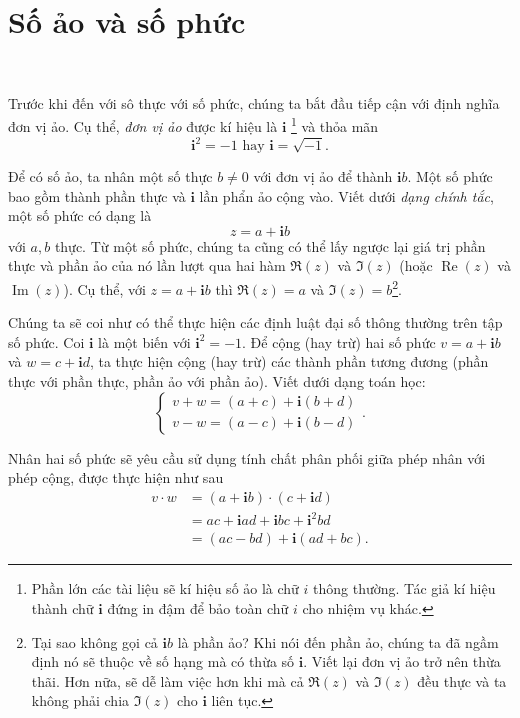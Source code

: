 \documentclass[a4paper, titlepage, openany]{book}
\begin{document}
\section{Số ảo và số phức}

\ %

Trước khi đến với sô thực với số phức, chúng ta bắt đầu tiếp cận với định nghĩa đơn vị ảo. Cụ thể, \emph{đơn vị ảo} được kí hiệu là $\mathbf{i}$ \footnote{Phần lớn các tài liệu sẽ kí hiệu số ảo là chữ $i$ thông thường. Tác giả kí hiệu thành chữ $\mathbf{i}$ đứng in đậm để bảo toàn chữ $i$ cho nhiệm vụ khác.} và thỏa mãn $$\mathbf{i}^2 = -1 \text{ hay } \mathbf{i} = \sqrt{-1}.$$

Để có số ảo, ta nhân một số thực $b \neq 0$ với đơn vị ảo để thành $\mathbf{i}b$. Một số phức bao gồm thành phần thực và $\mathbf{i}$ lần phẩn ảo cộng vào. Viết dưới \emph{dạng chính tắc}, một số phức có dạng là $$z=a+\mathbf{i}b$$ với $a, b$ thực. Từ một số phức, chúng ta cũng có thể lấy ngược lại giá trị phần thực và phần ảo của nó lần lượt qua hai hàm $\Re{(z)}$ và $\Im{(z)}$ (hoặc $\operatorname*{Re}{(z)}$ và $\operatorname*{Im}{(z)}$). Cụ thể, với $z=a+\mathbf{i}b$ thì $\Re{(z)} = a$ và $\Im{(z)}=b$\footnote{Tại sao không gọi cả $\mathbf{i}b$ là phần ảo? Khi nói đến phần ảo, chúng ta đã ngầm định nó sẽ thuộc về số hạng mà có thừa số $\mathbf{i}$. Viết lại đơn vị ảo trở nên thừa thãi. Hơn nữa, sẽ dễ làm việc hơn khi mà cả $\Re{(z)}$ và $\Im{(z)}$ đều thực và ta không phải chia $\Im{(z)}$ cho $\mathbf{i}$ liên tục.}.

Chúng ta sẽ coi như có thể thực hiện các định luật đại số thông thường trên tập số phức. Coi $\mathbf{i}$ là một biến với $\mathbf{i}^2 = -1$. Để cộng (hay trừ) hai số phức $v = a + \mathbf{i}b$ và $w = c + \mathbf{i}d$, ta thực hiện cộng (hay trừ) các thành phần tương đương (phần thực với phần thực, phần ảo với phần ảo). Viết dưới dạng toán học:
\begin{equation*}
   \begin{cases}
      v + w = (a + c) + \mathbf{i}(b + d) \\ 
      v - w = (a - c) + \mathbf{i}(b - d) 
   \end{cases}.
\end{equation*}

Nhân hai số phức sẽ yêu cầu sử dụng tính chất phân phối giữa phép nhân với phép cộng, được thực hiện như sau
\begin{align*}
   v\cdot w&=\left(a + \mathbf{i}b\right)\cdot\left(c + \mathbf{i}d\right) \\
      &= ac + \mathbf{i}ad + \mathbf{i}bc + \mathbf{i}^2 bd \\
      &= (ac - bd) + \mathbf{i}(ad + bc).
\end{align*}
\end{document}
